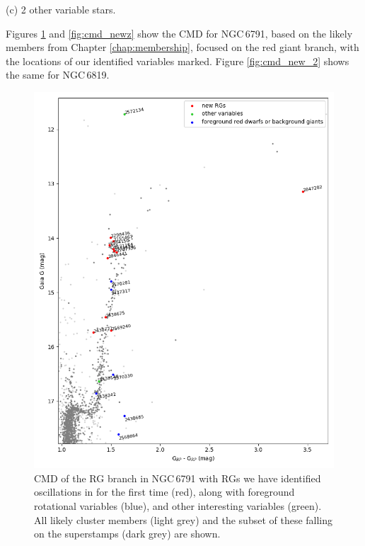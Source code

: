 (c) 2 other variable stars. 

Figures \ref{fig:cmd_new} and \ref{fig:cmd_newz} show the CMD for NGC\,6791, based on the likely members from Chapter \ref{chap:membership}, focused on the red giant branch, with the locations of our identified variables marked. Figure \ref{fig:cmd_new_2} shows the same for NGC\,6819.

\begin{figure}
    \centering
    \includegraphics[width=\linewidth]{Chapter5/6791_CMD.png}
    \caption[CMD of new variables in the RG branch in NGC 6791]{CMD of the RG branch in NGC\,6791 with RGs we have identified oscillations in for the first time (red), along with foreground rotational variables (blue), and other interesting variables (green). All likely cluster members (light grey) and the subset of these falling on the \Kepler{} superstamps (dark grey) are shown.}
    \label{fig:cmd_new}
\end{figure}

